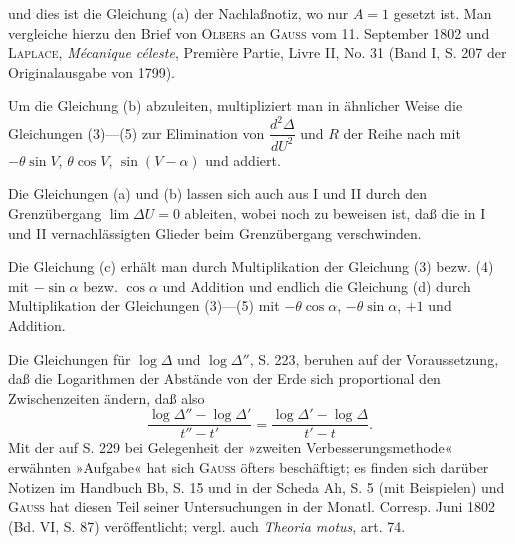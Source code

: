 \noindent und dies ist die Gleichung (a) der Nachlaßnotiz, wo nur $A=1$ gesetzt ist. Man vergleiche hierzu den Brief von \textsc{Olbers} an \textsc{Gauss} vom 11. September 1802 und \textsc{Laplace}, \textit{Mécanique céleste}, Première Partie, Livre II, No. 31 (Band I, S. 207 der Originalausgabe von 1799).

Um die Gleichung (b) abzuleiten, multipliziert man in ähnlicher Weise die Gleichungen (3)—(5) zur Elimination von $\dfrac{d^2\Delta}{dU^2}$ und $R$ der Reihe nach mit $-\theta\sin V$, $\theta\cos V$, $\sin(V-\alpha)$ und addiert.

Die Gleichungen (a) und (b) lassen sich auch aus I und II durch den Grenzübergang $\lim\Delta U=0$ ableiten, wobei noch zu beweisen ist, daß die in I und II vernachlässigten Glieder beim Grenzübergang verschwinden.

Die Gleichung (c) erhält man durch Multiplikation der Gleichung (3) bezw. (4) mit $-\sin\alpha$ bezw. $\cos\alpha$ und Addition und endlich die Gleichung (d) durch Multiplikation der Gleichungen (3)—(5) mit $-\theta\cos\alpha$, $-\theta\sin\alpha$, $+1$ und Addition.

Die Gleichungen für $\log\Delta$ und $\log\Delta''$, S. 223, beruhen auf der Voraussetzung, daß die Logarithmen der Abstände von der Erde sich proportional den Zwischenzeiten ändern, daß also
\[
\frac{\log\Delta''-\log\Delta'}{t''-t'}=\frac{\log\Delta'-\log\Delta}{t'-t}.
\]
\noindent\hspace*{\parindent}Mit der auf S. 229 bei Gelegenheit der »zweiten Verbesserungsmethode« erwähnten »Aufgabe« hat sich \textsc{Gauss} öfters beschäftigt; es finden sich darüber Notizen im Handbuch Bb, S. 15 und in der Scheda Ah, S. 5 (mit Beispielen) und \textsc{Gauss} hat diesen Teil seiner Untersuchungen in der Monatl. Corresp. Juni 1802 (Bd. VI, S. 87) veröffentlicht; vergl. auch \textit{Theoria motus}, art. 74.

